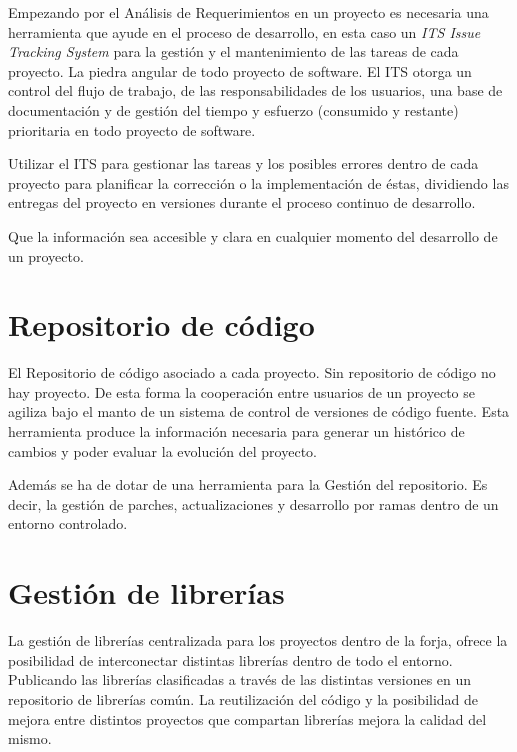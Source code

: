 \par Empezando por el An\'alisis de Requerimientos en un proyecto es necesaria una herramienta que ayude en el proceso de desarrollo, en esta caso un \emph{ITS Issue Tracking System} para la gestión y el mantenimiento de las tareas de cada proyecto. La piedra angular de todo proyecto de software. El ITS otorga un control del flujo de trabajo, de las responsabilidades de los usuarios, una base de documentación y de gestión del tiempo y esfuerzo (consumido y restante) prioritaria en todo proyecto de software.

\par Utilizar el ITS para gestionar las tareas y los posibles errores dentro de cada proyecto para planificar la corrección o la implementación de éstas, dividiendo las entregas del proyecto en versiones durante el proceso continuo de desarrollo.

\par Que la información sea accesible y clara en cualquier momento del desarrollo de un proyecto.


\section{Repositorio de código}
\label{sec:repositorio-codigo}

\par El Repositorio de c\'odigo asociado a cada proyecto. Sin repositorio de código no hay proyecto. De esta forma la cooperación entre usuarios de un proyecto se agiliza bajo el manto de un sistema de control de versiones de código fuente. Esta herramienta produce la información necesaria para generar un histórico de cambios y poder evaluar la evolución del proyecto.

\par Además se ha de dotar de una herramienta para la Gesti\'on del repositorio. Es decir, la gestión de parches, actualizaciones y desarrollo por ramas dentro de un entorno controlado.


\section{Gestión de librerías}
\label{sec:gestion-librerias}

\par La gesti\'on de librer\'ias centralizada para los proyectos dentro de la forja, ofrece la posibilidad de interconectar distintas librerías dentro de todo el entorno. Publicando las librerías clasificadas a través de las distintas versiones en un repositorio de librerías común. La reutilización del código y la posibilidad de mejora entre distintos proyectos que compartan librerías mejora la calidad del mismo.

